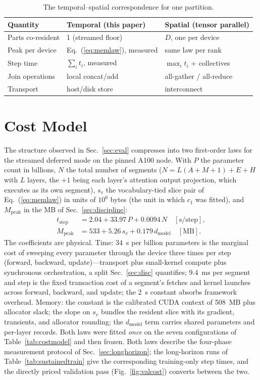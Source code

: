 \documentclass[journal]{IEEEtran}
\begin{document}
\begin{table}[t]
\caption{The temporal--spatial correspondence for one partition.}
\label{tab:spatial}
\centering
\small
\begin{tabular}{@{}lll@{}}
\toprule
Quantity & Temporal (this paper) & Spatial (tensor parallel) \\
\midrule
Parts co-resident & 1 (streamed floor) & $D$, one per device \\
Peak per device & Eq.~(\ref{eq:memlaw}), measured & same law per rank \\
Step time & $\sum_i t_i$, measured & $\max_i t_i$ + collectives \\
Join operations & local concat/add & all-gather / all-reduce \\
Transport & host/disk store & interconnect \\
\bottomrule
\end{tabular}
\end{table}
\section{Cost Model}\label{sec:model}
The structure observed in Sec.~\ref{sec:eval} compresses into two
first-order laws for the streamed deferred mode on the pinned A100 node.
With $P$ the parameter count in billions, $N$ the total number of segments
($N = L(A{+}M{+}1) + E + H$ with $L$ layers, the $+1$ being each layer's attention output
projection, which executes as its own segment), $s_v$ the vocabulary-tied
slice pair of Eq.~(\ref{eq:memlaw}) in units of $10^6$ bytes (the unit in
which $c_1$ was fitted), and $M_\text{peak}$ in the MB of
Sec.~\ref{sec:discipline}:
\begin{align}
t_\text{step} &= 2.04 + 33.97\,P + 0.0094\,N \quad[\text{s/step}],\label{eq:timelaw}\\
M_\text{peak} &= 533 + 5.26\,s_v + 0.179\,d_\text{model} \quad[\text{MB}].\nonumber
\end{align}
The coefficients are physical. Time: 34~s per billion parameters is the
marginal cost of sweeping every parameter through the device three times
per step (forward, backward, update)---transport plus small-kernel compute
plus synchronous orchestration, a split Sec.~\ref{sec:disc} quantifies;
9.4~ms per segment and step is the fixed transaction cost of a segment's
fetches and kernel launches across forward, backward, and update; the 2~s constant absorbs framework overhead. Memory: the constant is the calibrated CUDA context of 508~MB plus
allocator slack; the slope on $s_v$ bundles the resident slice with its
gradient, transients, and allocator rounding; the $d_\text{model}$ term
carries shared parameters and per-layer records. Both laws were fitted \emph{once} on the seven
configurations of Table~\ref{tab:costmodel} and then frozen. Both laws describe the four-phase measurement protocol of
Sec.~\ref{sec:longhorizon};
the long-horizon runs of Table~\ref{tab:sustainedtrain} give the
corresponding training-only step times, and the directly priced validation
pass (Fig.~\ref{fig:valcost}) converts between the two.
\end{document}
